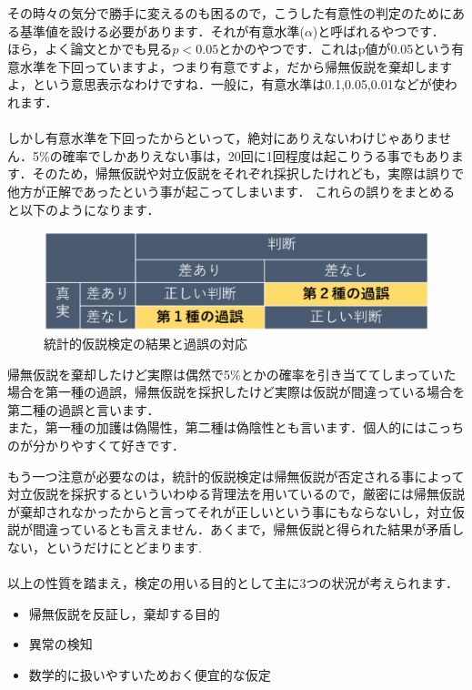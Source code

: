 \documentclass[11pt,a4paper,uplatex]{ujreport} 	%
\begin{document}
その時々の気分で勝手に変えるのも困るので，こうした有意性の判定のためにある基準値を設ける必要があります．それが有意水準($\alpha$)と呼ばれるやつです．\\

ほら，よく論文とかでも見る$p<0.05$とかのやつです．これはp値が0.05という有意水準を下回っていますよ，つまり有意ですよ，だから帰無仮説を棄却しますよ，という意思表示なわけですね．一般に，有意水準は0.1,0.05,0.01などが使われます．\\
\\

しかし有意水準を下回ったからといって，絶対にありえないわけじゃありません．5\%の確率でしかありえない事は，20回に1回程度は起こりうる事でもあります．そのため，帰無仮説や対立仮説をそれぞれ採択したけれども，実際は誤りで他方が正解であったという事が起こってしまいます．
これらの誤りをまとめると以下のようになります．

\begin{figure}[H]
  \includegraphics[width=15cm]{../figures/miss.eps}
  \caption{統計的仮説検定の結果と過誤の対応}
\end{figure}

帰無仮説を棄却したけど実際は偶然で5\%とかの確率を引き当ててしまっていた場合を第一種の過誤，帰無仮説を採択したけど実際は仮説が間違っている場合を第二種の過誤と言います．\\

また，第一種の加護は偽陽性，第二種は偽陰性とも言います．個人的にはこっちのが分かりやすくて好きです．

もう一つ注意が必要なのは，統計的仮説検定は帰無仮説が否定される事によって対立仮説を採択するといういわゆる背理法を用いているので，厳密には帰無仮説が棄却されなかったからと言ってそれが正しいという事にもならないし，対立仮説が間違っているとも言えません．あくまで，帰無仮説と得られた結果が矛盾しない，というだけにとどまります. \\\\

以上の性質を踏まえ，検定の用いる目的として主に3つの状況が考えられます．\\

\begin{itemize}
  \item 帰無仮説を反証し，棄却する目的
  \item 異常の検知
  \item 数学的に扱いやすいためおく便宜的な仮定
\end{itemize}
\end{document}
